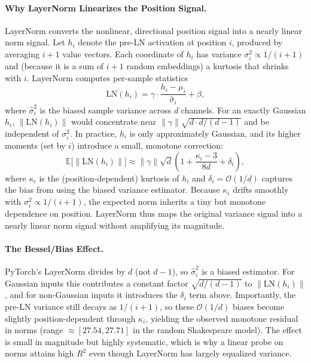 \documentclass[11pt]{article}
\begin{document}
\paragraph{Why LayerNorm Linearizes the Position Signal.}
LayerNorm converts the nonlinear, directional position signal into a nearly linear norm signal. Let $h_i$ denote the pre-LN activation at position $i$, produced by averaging $i{+}1$ value vectors. Each coordinate of $h_i$ has variance $\sigma_i^2 \propto 1/(i{+}1)$ and (because it is a sum of $i{+}1$ random embeddings) a kurtosis that shrinks with $i$. LayerNorm computes per-sample statistics
\begin{equation}
\text{LN}(h_i) = \gamma \cdot \frac{h_i - \mu_i}{\hat\sigma_i} + \beta,
\end{equation}
where $\hat\sigma_i^2$ is the biased sample variance across $d$ channels. For an exactly Gaussian $h_i$, $\|\text{LN}(h_i)\|$ would concentrate near $\|\gamma\|\sqrt{d\cdot d/(d-1)}$ and be independent of $\sigma_i^2$. In practice, $h_i$ is only approximately Gaussian, and its higher moments (set by $i$) introduce a small, monotone correction:
\begin{equation}
\mathbb{E}\big[\|\text{LN}(h_i)\|\big] \approx \|\gamma\| \sqrt{d} \left(1 + \frac{\kappa_i - 3}{8d} + \delta_i\right),
\end{equation}
where $\kappa_i$ is the (position-dependent) kurtosis of $h_i$ and $\delta_i = \mathcal{O}(1/d)$ captures the bias from using the biased variance estimator. Because $\kappa_i$ drifts smoothly with $\sigma_i^2 \propto 1/(i{+}1)$, the expected norm inherits a tiny but monotone dependence on position. LayerNorm thus maps the original variance signal into a nearly linear norm signal without amplifying its magnitude.

\paragraph{The Bessel/Bias Effect.}
PyTorch's LayerNorm divides by $d$ (not $d{-}1$), so $\hat\sigma_i^2$ is a biased estimator. For Gaussian inputs this contributes a constant factor $\sqrt{d/(d-1)}$ to $\|\text{LN}(h_i)\|$, and for non-Gaussian inputs it introduces the $\delta_i$ term above. Importantly, the pre-LN variance still decays as $1/(i{+}1)$, so these $\mathcal{O}(1/d)$ biases become slightly position-dependent through $\kappa_i$, yielding the observed monotone residual in norms (range $\approx[27.54, 27.71]$ in the random Shakespeare model). The effect is small in magnitude but highly systematic, which is why a linear probe on norms attains high $R^2$ even though LayerNorm has largely equalized variance.
\end{document}
